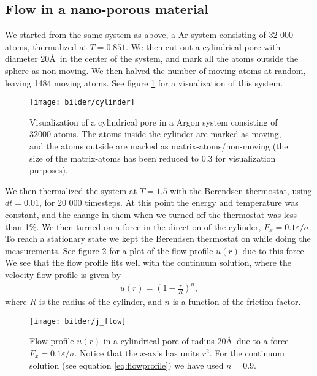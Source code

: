 \FloatBarrier
\subsection*{Flow in a nano-porous material}

We started from the same system as above, a Ar system consisting of 32 000 atoms, thermalized at $T = 0.851$. We then cut out a cylindrical pore with diameter 20\AA\ in the center of the system, and mark all the atoms outside the sphere as non-moving. We then halved the number of moving atoms at random, leaving 1484 moving atoms. See figure \ref{fig:cylinder} for a visualization of this system.

\begin{figure}[ht!]
    \centering
    \texttt{[image: bilder/cylinder]}
    \parbox{0.8\textwidth}{
        \caption{
            \small{
                Visualization of a cylindrical pore in a Argon system consisting of 32000 atoms. The atoms inside the cylinder are marked as moving, and the atoms outside are marked as matrix-atoms/non-moving (the size of the matrix-atoms has been reduced to 0.3 for visualization purposes).
            }
            \label{fig:cylinder}
        }
    }
\end{figure}

We then thermalized the system at $T = 1.5$ with the Berendsen thermostat, using $dt = 0.01$, for 20 000 timesteps. At this point the energy and temperature was constant, and the change in them when we turned off the thermostat was less than 1\%. We then turned on a force in the direction of the cylinder, $F_x = 0.1\varepsilon/\sigma$. To reach a stationary state we kept the Berendsen thermostat on while doing the measurements. See figure \ref{fig:flowprofile} for a plot of the flow profile $u(r)$ due to this force. We see that the flow profile fits well with the continuum solution, where the velocity flow profile is given by
\begin{align}
    \label{eq:flowprofile}
    u(r) = \left(1 - \frac{r}{R}\right)^n,
\end{align}
where $R$ is the radius of the cylinder, and $n$ is a function of the friction factor.

\begin{figure}[ht!]
    \centering
    \texttt{[image: bilder/j\_flow]}
    \parbox{0.8\textwidth}{
        \caption{
            \small{
                Flow profile $u(r)$ in a cylindrical pore of radius 20\AA\ due to a force $F_x = 0.1\varepsilon/\sigma$. Notice that the $x$-axis has units $r^2$. For the continuum solution (see equation \ref{eq:flowprofile}) we have used $n = 0.9$.
            }
            \label{fig:flowprofile}
        }
    }
\end{figure}

